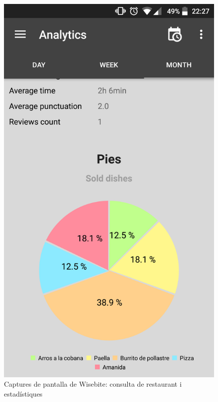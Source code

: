 \begin{figure}[!h]
\includegraphics[scale=0.15]{Figures/wisebite_screenshot_6.png}
\caption{Captures de pantalla de Wisebite: consulta de restaurant i estadístiques}
\end{figure}

